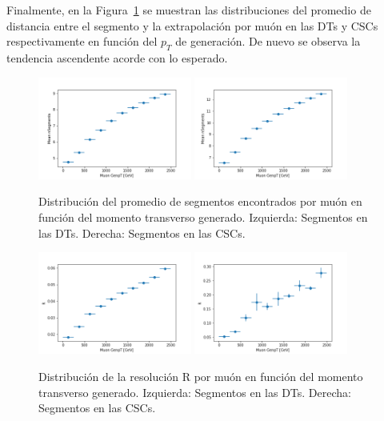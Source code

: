 Finalmente, en la Figura~\ref{fig:data_nSegmentsMean} se muestran las distribuciones del promedio de distancia entre el segmento y la extrapolaci\'on por mu\'on en las DTs y CSCs respectivamente en funci\'on del $p_{T}$ de generaci\'on. De nuevo se observa la tendencia ascendente acorde con lo esperado. \\

\begin{figure}[h!]
\centering
\includegraphics[width=0.45\textwidth]{figures/data_genpt_DT_MeanNSegments.png}
\includegraphics[width=0.45\textwidth]{figures/data_genpt_CSC_MeanNSegments.png}
\caption{Distribuci\'on del promedio de segmentos encontrados por mu\'on en funci\'on del momento transverso generado. Izquierda: Segmentos en las DTs. Derecha: Segmentos en las CSCs.}
\label{fig:data_nSegmentsMean}        
\end{figure}

\begin{figure}[h!]
\centering
\includegraphics[width=0.45\textwidth]{figures/data_genpt_DT_R.png}
\includegraphics[width=0.45\textwidth]{figures/data_genpt_CSC_R.png}
\caption{Distribuci\'on de la resoluci\'on R por mu\'on en funci\'on del momento transverso generado. Izquierda: Segmentos en las DTs. Derecha: Segmentos en las CSCs.}
\label{fig:data_R_genpt}        
\end{figure}



